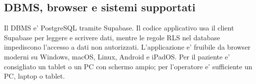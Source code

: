 \subsection{DBMS, browser e sistemi supportati}

Il DBMS e' PostgreSQL tramite Supabase. Il codice applicativo usa il client Supabase per leggere e scrivere dati, mentre le regole RLS nel database impediscono l'accesso a dati non autorizzati. L'applicazione e' fruibile da browser moderni su Windows, macOS, Linux, Android e iPadOS. Per il paziente e' consigliato un tablet o un PC con schermo ampio; per l'operatore e' sufficiente un PC, laptop o tablet.

\newpage
